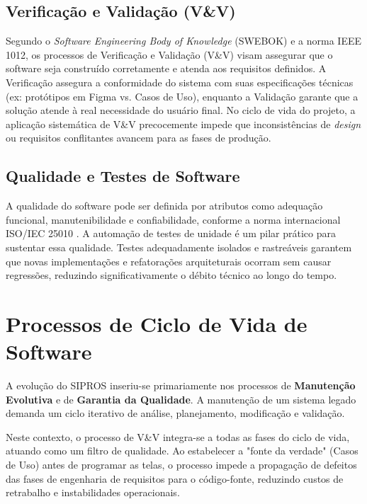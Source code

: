 \subsection{Verificação e Validação (V\&V)}

Segundo o \textit{Software Engineering Body of Knowledge} (SWEBOK) \cite{swebok_v3} e a norma IEEE 1012, os processos de Verificação e Validação (V\&V) visam assegurar que o software seja construído corretamente e atenda aos requisitos definidos. A Verificação assegura a conformidade do sistema com suas especificações técnicas (ex: protótipos em Figma vs. Casos de Uso), enquanto a Validação garante que a solução atende à real necessidade do usuário final. No ciclo de vida do projeto, a aplicação sistemática de V\&V precocemente impede que inconsistências de \textit{design} ou requisitos conflitantes avancem para as fases de produção.

\subsection{Qualidade e Testes de Software}

A qualidade do software pode ser definida por atributos como adequação funcional, manutenibilidade e confiabilidade, conforme a norma internacional ISO/IEC 25010 \cite{iso25010}. A automação de testes de unidade é um pilar prático para sustentar essa qualidade. Testes adequadamente isolados e rastreáveis garantem que novas implementações e refatorações arquiteturais ocorram sem causar regressões, reduzindo significativamente o débito técnico ao longo do tempo.

\section{Processos de Ciclo de Vida de Software}

A evolução do SIPROS inseriu-se primariamente nos processos de \textbf{Manutenção Evolutiva} e de \textbf{Garantia da Qualidade}. A manutenção de um sistema legado demanda um ciclo iterativo de análise, planejamento, modificação e validação. 

Neste contexto, o processo de V\&V integra-se a todas as fases do ciclo de vida, atuando como um filtro de qualidade. Ao estabelecer a "fonte da verdade" (Casos de Uso) antes de programar as telas, o processo impede a propagação de defeitos das fases de engenharia de requisitos para o código-fonte, reduzindo custos de retrabalho e instabilidades operacionais.

